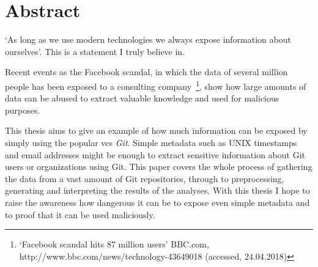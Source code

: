 \chapter*{Abstract}


`As long as we use modern technologies we always expose information about ourselves'. This is a statement I truly believe in.

Recent events as the Facebook scandal, in which the data of several million people has been exposed to a consulting company~\footnote{`Facebook scandal hits 87 million users' BBC.com, http://www.bbc.com/news/technology-43649018 (accessed, 24.04.2018)}, show how large amounts of data can be abused to extract valuable knowledge and used for malicious purposes.

This thesis aims to give an example of how much information can be exposed by simply using the popular \ac{vcs} \emph{Git}.
Simple metadata such as UNIX timestamps and email addresses might be enough to extract sensitive information about Git users or organizations using Git.
This paper covers the whole process of gathering the data from a vast amount of Git repositories, through to preprocessing, generating and interpreting the results of the analyses.
With this thesis I hope to raise the awareness how dangerous it can be to expose even simple metadata and to proof that it can be used maliciously.
